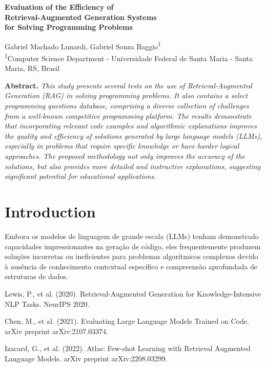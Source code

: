 \documentclass[a4paper,12pt]{article}
\begin{document}
\vspace{2cm}

\begin{center}
    {\Large\bfseries Evaluation of the Efficiency of \\
    Retrieval-Augmented Generation Systems\\
    for Solving Programming Problems \\[1em]}
    
    \normalsize
    Gabriel Machado Lunardi, Gabriel Souza Baggio\textsuperscript{1}\\[0.5em]
    
    \small
    \textsuperscript{1}Computer Science Department - Universidade Federal de Santa Maria - Santa Maria, RS, Brasil
\end{center}

\vspace{1cm}

\noindent
\textbf{Abstract.} \textit{
This study presents several tests on the use of Retrieval-Augmented Generation (RAG) in solving programming problems. It also contains a select programming questions database, comprising a diverse collection of challenges from a well-known competitive programming platform. The results demonstrate that incorporating relevant code examples and algorithmic explanations improves the quality and efficiency of solutions generated by large language models (LLMs), especially in problems that require specific knowledge or have harder logical approaches. The proposed methodology not only improves the accuracy of the solutions, but also provides more detailed and instructive explanations, suggesting significant potential for educational applications.
}

\vspace{1cm}

\section{Introduction}
Embora os modelos de linguagem de grande escala (LLMs) tenham demonstrado capacidades impressionantes na geração de código, eles frequentemente produzem soluções incorretas ou ineficientes para problemas algorítmicos complexos devido à ausência de conhecimento contextual específico e compreensão aprofundada de estruturas de dados.

\begin{thebibliography}{99}
     Lewis, P., et al. (2020). Retrieval-Augmented Generation for Knowledge-Intensive NLP Tasks. NeurIPS 2020.
    
     Chen, M., et al. (2021). Evaluating Large Language Models Trained on Code. arXiv preprint arXiv:2107.03374.
    
     Izacard, G., et al. (2022). Atlas: Few-shot Learning with Retrieval Augmented Language Models. arXiv preprint arXiv:2208.03299.
    
\end{thebibliography}
\end{document}

